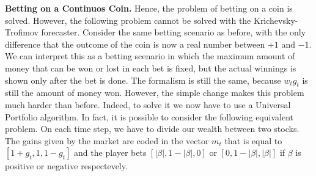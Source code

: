 \textbf{Betting on a Continuos Coin.}
Hence, the problem of betting on a coin is solved. However, the following problem cannot be solved with the Krichevsky-Trofimov forecaster. Consider the same betting scenario as before, with the only difference that the outcome of the coin is now a real number between $+1$ and $-1$. We can interpret this as a betting scenario in which the maximum amount of money that can be won or lost in each bet is fixed, but the actual winnings is shown only after the bet is done. The formalism is still the same, because $w_t g_t$ is still the amount of money won. However, the simple change makes this problem much harder than before. Indeed, to solve it we now have to use a Universal Portfolio algorithm. In fact, it is possible to consider the following equivalent problem. On each time step, we have to divide our wealth between two stocks. The gains given by the market are coded in the vector $m_t$ that is equal to $[1+g_t, 1, 1-g_t]$ and the player bets $[|\beta|,1-|\beta|,0]$ or  $[0,1-|\beta|,|\beta|]$ if $\beta$ is positive or negative respectevely.